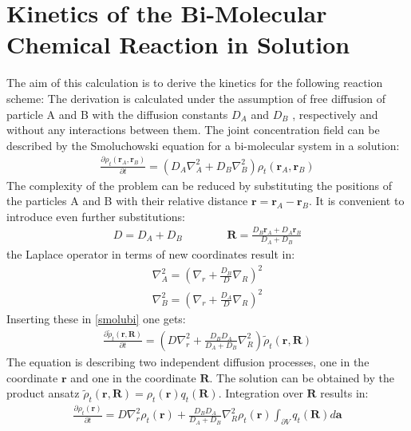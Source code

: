 \documentclass[
  a4paper,BCOR10mm,oneside,
  bibtotoc,idxtotoc,
  headsepline,footsepline,%
  fleqn,openbib
]{scrbook}
\begin{document}
\section{Kinetics of the Bi-Molecular Chemical Reaction in Solution}\label{bi-molecular}
The aim of this calculation is to derive the kinetics for the following reaction scheme: \newline
The derivation is calculated under the assumption of free diffusion of particle A and B with the diffusion constants $D_A$ and $D_B$ , respectively and without any interactions between them. 
The joint concentration field can be described by the Smoluchowski equation for a bi-molecular system in a solution:
\begin{align}
 \frac{\partial \rho_t(\bm{r}_A,\bm{r}_B)}{\partial t}=(D_A \nabla^{2}_{A}+D_B \nabla^{2}_{B}) \rho_t(\bm{r}_A,\bm{r}_B) \label{smolubi}
\end{align}
The complexity of the problem can be reduced by substituting the positions of the particles A and B with their relative distance $\bm{r}=\bm{r}_A-\bm{r}_B$. It is convenient to introduce even further substitutions:
\begin{align}
 D= D_A+D_B \qquad \qquad \bm{R}=\frac{D_B \bm{r}_A+ D_A \bm{r}_B}{D_A+D_B}
\end{align}
the Laplace operator in terms of new coordinates result in:
\begin{align}
\nabla^{2}_{A} = \left( \nabla_r+\frac{D_B}{D} \nabla_R \right)^2 \\
\nabla^{2}_{B} = \left( \nabla_r+\frac{D_A}{D} \nabla_R \right)^2 
\end{align}
Inserting these in \cref{smolubi} one gets:
\begin{align}
 \frac{\partial \tilde{\rho}_t(\bm{r},\bm{R})}{\partial t}=\left(D \nabla^{2}_{r}+\frac{D_B D_A}{D_A+D_B}\nabla^{2}_{R}\right) \tilde{\rho}_t(\bm{r},\bm{R})
\end{align}
The equation is describing two independent diffusion processes, one in
the coordinate $\bm{r}$ and one in the coordinate $\bm{R}$. The solution can be obtained by the product ansatz $\tilde{\rho}_t(\bm{r},\bm{R})=\rho_t(\bm{r})q_t(\bm{R})$. Integration over $\bm{R}$ results in:
\begin{align}
\frac{\partial \rho_t(\bm{r})}{\partial t}=D \nabla^{2}_{r} \rho_t(\bm{r}) +\frac{D_B D_A}{D_A+D_B} \nabla^{2}_{R} \rho_t(\bm{r}) \int_{\partial V} q_t(\bm{R}) d \bm{a}
\end{align}
\end{document}
